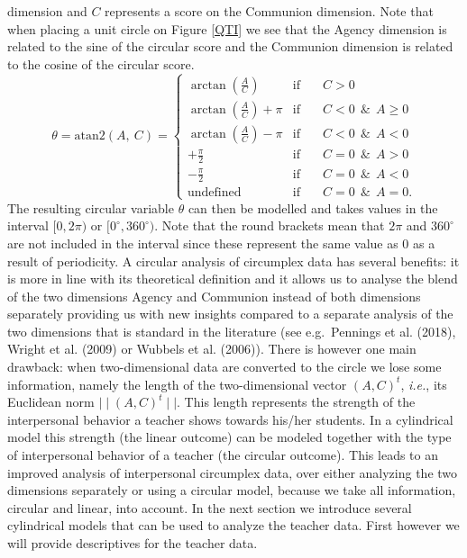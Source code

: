 \documentclass[man]{apa6}
\theoremstyle{definition}
\theoremstyle{definition}
\theoremstyle{definition}
\theoremstyle{remark}
\begin{document}
dimension and \(C\) represents a score on the Communion dimension. Note
that when placing a unit circle on Figure \ref{QTI} we see that the
Agency dimension is related to the sine of the circular score and the
Communion dimension is related to the cosine of the circular score.
\begin{equation}\label{PredVal}
\theta          = \text{atan2}\left(A, \: C\right)  =
\left\{{\begin{array}{lcl}
                                                                       \arctan\left(\frac{A}{C}\right) & \text{if}  \quad&C > 0 \\
\arctan\left(\frac{A}{C}\right) + \pi & \text{if}  \quad& C  <  0  \:\: \&\:\: A \geq 0\\
 \arctan\left(\frac{A}{C}\right) - \pi & \text{if}  \quad&C  <  0 \:\:  \&\:\:A  < 0\\
 +\frac{\pi}{2} & \text{if}  \quad& C  =  0  \:\: \&\:\:A > 0\\
 -\frac{\pi}{2} & \text{if}  \quad& C =  0  \:\: \&\:\:A < 0\\
 \text{undefined} & \text{if} \quad& C =  0   \:\: \&\:\:A = 0.
 \end{array}}
\right.
\end{equation} The resulting circular variable \(\theta\) can then be
modelled and takes values in the interval \([0, 2\pi)\) or
\([0^\circ, 360^\circ)\). Note that the round brackets mean that
\(2\pi\) and \(360^\circ\) are not included in the interval since these
represent the same value as 0 as a result of periodicity. \newline
\indent A circular analysis of circumplex data has several benefits: it
is more in line with its theoretical definition and it allows us to
analyse the blend of the two dimensions Agency and Communion instead of
both dimensions separately providing us with new insights compared to a
separate analysis of the two dimensions that is standard in the
literature (see e.g.~Pennings et al. (2018), Wright et al. (2009) or
Wubbels et al. (2006)). There is however one main drawback: when
two-dimensional data are converted to the circle we lose some
information, namely the length of the two-dimensional vector
\((A, C)^t\), \emph{i.e.}, its Euclidean norm
\(\mid\mid (A, C)^t \mid\mid\). This length represents the strength of
the interpersonal behavior a teacher shows towards his/her students. In
a cylindrical model this strength (the linear outcome) can be modeled
together with the type of interpersonal behavior of a teacher (the
circular outcome). This leads to an improved analysis of interpersonal
circumplex data, over either analyzing the two dimensions separately or
using a circular model, because we take all information, circular and
linear, into account. In the next section we introduce several
cylindrical models that can be used to analyze the teacher data. First
however we will provide descriptives for the teacher data.
\end{document}

